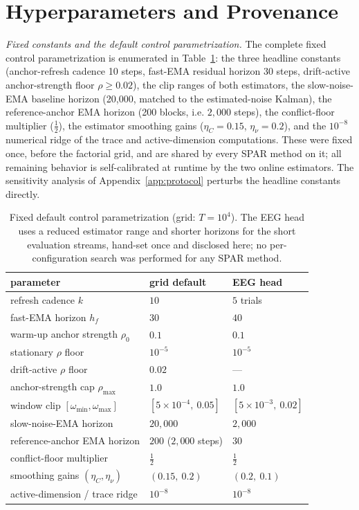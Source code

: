 \documentclass[11pt]{article}
\begin{document}
\section{Hyperparameters and Provenance}
\label{app:hyper}


\emph{Fixed constants and the default control parametrization.}
The complete fixed control parametrization is enumerated in Table~\ref{tab:hyper}: the three headline constants (anchor-refresh cadence 10 steps, fast-EMA residual horizon 30 steps, drift-active anchor-strength floor $\rho \ge 0.02$), the clip ranges of both estimators, the slow-noise-EMA baseline horizon (20{,}000, matched to the estimated-noise Kalman), the reference-anchor EMA horizon (200 blocks, i.e. $2{,}000$ steps), the conflict-floor multiplier ($\tfrac12$), the estimator smoothing gains ($\eta_C = 0.15$, $\eta_\nu = 0.2$), and the $10^{-8}$ numerical ridge of the trace and active-dimension computations.
These were fixed once, before the factorial grid, and are shared by every SPAR method on it; all remaining behavior is self-calibrated at runtime by the two online estimators.
The sensitivity analysis of Appendix~\ref{app:protocol} perturbs the headline constants directly.

\begin{table}[htbp]
\centering
\small
\caption{Fixed default control parametrization (grid: $T = 10^4$). The EEG head uses a reduced estimator range and shorter horizons for the short evaluation streams, hand-set once and disclosed here; no per-configuration search was performed for any SPAR method.}
\label{tab:hyper}
\begin{tabular}{lll}
\toprule
parameter & grid default & EEG head \\
\midrule
refresh cadence $k$ & $10$ & $5$ trials \\
fast-EMA horizon $h_f$ & $30$ & $40$ \\
warm-up anchor strength $\rho_0$ & $0.1$ & $0.1$ \\
stationary $\rho$ floor & $10^{-5}$ & $10^{-5}$ \\
drift-active $\rho$ floor & $0.02$ & --- \\
anchor-strength cap $\rho_{\max}$ & $1.0$ & $1.0$ \\
window clip $[\omega_{\min}, \omega_{\max}]$ & $[5\times10^{-4},\ 0.05]$ & $[5\times10^{-3},\ 0.02]$ \\
slow-noise-EMA horizon & $20{,}000$ & $2{,}000$ \\
reference-anchor EMA horizon & $200$ ($2{,}000$ steps) & $30$ \\
conflict-floor multiplier & $\tfrac12$ & $\tfrac12$ \\
smoothing gains $(\eta_C, \eta_\nu)$ & $(0.15,\ 0.2)$ & $(0.2,\ 0.1)$ \\
active-dimension / trace ridge & $10^{-8}$ & $10^{-8}$ \\
\bottomrule
\end{tabular}
\end{table}
\end{document}
